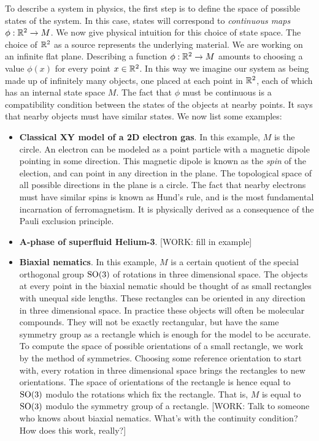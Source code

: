 \documentclass{article}
\theoremstyle{definition}
\numberwithin{figure}{section}
\begin{document}
To describe a system in physics, the first step is to define the space of possible states of the system. In this case, states will correspond to \textit{continuous maps $\phi: \mathbb{R}^2\to M$}. We now give physical intuition for this choice of state space. The choice of $\mathbb{R}^2$ as a source represents the underlying material. We are working on an infinite flat plane. Describing a function $\phi: \mathbb{R}^2\to M$ amounts to choosing a value $\phi(x)$ for every point $x\in \mathbb{R}^2$. In this way we imagine our system as being made up of infinitely many objects, one placed at each point in $\mathbb{R}^2$, each of which has an internal state space $M$. The fact that $\phi$ must be continuous is a compatibility condition between the states of the objects at nearby points. It says that nearby objects must have similar states. We now list some examples:

\begin{itemize}
\item \textbf{Classical XY model of a 2D electron gas}. In this example, $M$ is the circle. An electron can be modeled as a point particle with a magnetic dipole pointing in some direction. This magnetic dipole is known as the \textit{spin} of the election, and can point in any direction in the plane. The topological space of all possible directions in the plane is a circle. The fact that nearby electrons must have similar spins is known as Hund’s rule, and is the most fundamental incarnation of ferromagnetism. It is physically derived as a consequence of the Pauli exclusion principle.

\item \textbf{A-phase of superfluid Helium-3}.  [WORK: fill in example]

\item \textbf{Biaxial nematics}. In this example, $M$ is a certain quotient of the special orthogonal group $\mathrm{SO}(3)$ of rotations in three dimensional space. The objects at every point in the biaxial nematic should be thought of as small rectangles with unequal side lengths. These rectangles can be oriented in any direction in three dimensional space. In practice these objects will often be molecular compounds. They will not be exactly rectangular, but have the same symmetry group as a rectangle which is enough for the model to be accurate. To compute the space of possible orientations of a small rectangle, we work by the method of symmetries. Choosing some reference orientation to start with, every rotation in three dimensional space brings the rectangles to new orientations. The space of orientations of the rectangle is hence equal to $\mathrm{SO}(3)$ modulo the rotations which fix the rectangle. That is, $M$ is equal to $\mathrm{SO}(3)$ modulo the symmetry group of a rectangle. [WORK: Talk to someone who knows about biaxial nematics. What's with the continuity condition? How does this work, really?]
\end{itemize}
\end{document}
